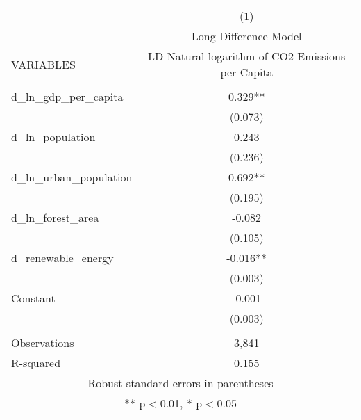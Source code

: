 \begin{tabular}{lc} \hline
 & (1) \\
 & Long Difference Model \\
VARIABLES & LD Natural logarithm of CO2 Emissions per Capita \\ \hline
 &  \\
d\_ln\_gdp\_per\_capita & 0.329** \\
 & (0.073) \\
d\_ln\_population & 0.243 \\
 & (0.236) \\
d\_ln\_urban\_population & 0.692** \\
 & (0.195) \\
d\_ln\_forest\_area & -0.082 \\
 & (0.105) \\
d\_renewable\_energy & -0.016** \\
 & (0.003) \\
Constant & -0.001 \\
 & (0.003) \\
 &  \\
Observations & 3,841 \\
 R-squared & 0.155 \\ \hline
\multicolumn{2}{c}{ Robust standard errors in parentheses} \\
\multicolumn{2}{c}{ ** p$<$0.01, * p$<$0.05} \\
\end{tabular}
